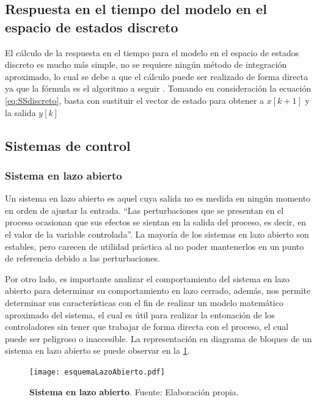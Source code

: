     \subsection{Respuesta en el tiempo del modelo en el espacio de estados discreto}
    
        El cálculo de la respuesta en el tiempo para el modelo en el espacio de estados discreto es mucho más simple, no se requiere ningún método de integración aproximado, lo cual se debe a que el cálculo puede ser realizado de forma directa ya que la fórmula es el algoritmo a seguir \Parencite{haugen2005discrete}. Tomando en consideración la ecuación \cref{eq:SSdiscreto}, basta con sustituir el vector de estado para obtener a $x[k+1]$ y la salida $y[k]$
        
    
        \subsection{Sistemas de control}
		
		\subsubsection{Sistema en lazo abierto}
		
            Un sistema en lazo abierto es aquel cuya salida no es medida en ningún momento en orden de ajustar la entrada. \enquote{Las perturbaciones que se presentan en el proceso ocasionan que sus efectos se sientan en la salida del proceso, es decir, en el valor de la variable controlada}\Parencite[p.$\,$350]{maloney2006electronica}. La mayoría de los sistemas en lazo abierto son estables, pero carecen de utilidad práctica al no poder mantenerlos en un punto de referencia debido a las perturbaciones.
            
            Por otro lado, es importante analizar el comportamiento del sistema en lazo abierto para determinar su comportamiento en lazo cerrado, además, nos permite determinar sus características con el fin de realizar un modelo matemático aproximado del sistema, el cual es útil para realizar la entonación de los controladores sin tener que trabajar de forma directa con el proceso, el cual puede ser peligroso o inaccesible. La representación en diagrama de bloques de un sistema en lazo abierto se puede observar en la \cref{fig:esquemaLazoAbierto}.
            
            \begin{figure}[htb]
				\centering
				\texttt{[image: esquemaLazoAbierto.pdf]}
				\caption[Ejemplo de un sistema en lazo abierto]{\textbf{Sistema en lazo abierto}. Fuente: Elaboración propia.} 
				\label{fig:esquemaLazoAbierto}
            \end{figure}
        
